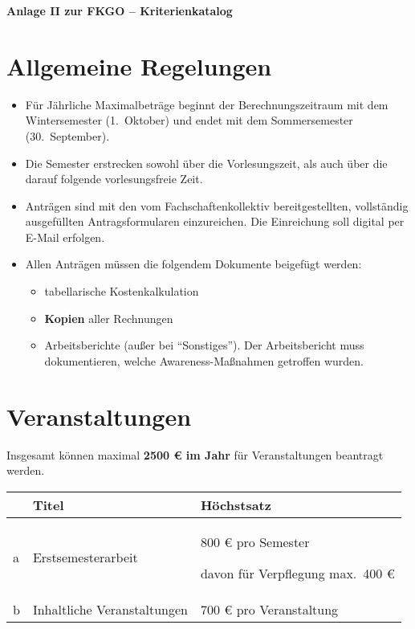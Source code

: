 \documentclass{article}
\begin{document}
\noindent
\begin{center}
    \huge \textbf{Anlage II zur FKGO -- Kriterienkatalog}
\end{center}

\section{Allgemeine Regelungen}
    \begin{itemize}
        \item Für Jährliche Maximalbeträge beginnt der Berechnungszeitraum mit dem Wintersemester (1.\ Oktober) und endet mit dem Sommersemester (30.\ September).
        \item Die Semester erstrecken sowohl über die Vorlesungszeit, als auch über die darauf folgende vorlesungsfreie Zeit.
        \item Anträgen sind mit den vom Fachschaftenkollektiv bereitgestellten, vollständig ausgefüllten Antragsformularen einzureichen. 
        	Die Einreichung soll digital per E-Mail erfolgen.
        \item Allen Anträgen müssen die folgendem Dokumente beigefügt werden:
        \begin{itemize}
            \item tabellarische Kostenkalkulation
            \item \textbf{Kopien} aller Rechnungen
            \item Arbeitsberichte (außer bei  "`Sonstiges"'). 
            	Der Arbeitsbericht muss dokumentieren, welche Awareness-Maßnahmen getroffen wurden.
        \end{itemize}
    \end{itemize}

\section{Veranstaltungen}
    Insgesamt können maximal \textbf{2500 € im Jahr} für Veranstaltungen beantragt werden. \\
    
    \setlength\extrarowheight{2mm} \sffamily    
    \begin{tabular}{l||L{6cm}|L{7cm}}

         &\textbf{Titel}  & \textbf{Höchstsatz} \\[1mm] \hline \hline
         a&
         Erstsemesterarbeit &
         800 € pro Semester\par
         davon für Verpflegung max.\ 400 € \\[1mm] \hline
          
        b&
        Inhaltliche Veranstaltungen & 
        700 € pro Veranstaltung \\[1mm]
        
    \end{tabular}
    \rmfamily
\end{document}
